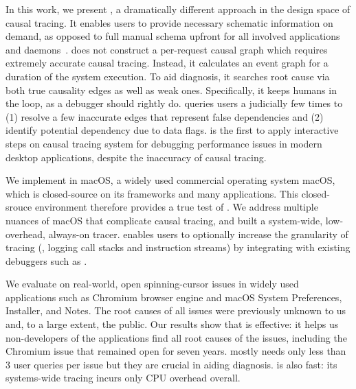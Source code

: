 In this work, we present \xxx, a dramatically different approach in the design
space of causal tracing. It enables users to provide necessary schematic
information on demand, as opposed to full manual schema upfront for all
involved applications and daemons~\cite{barham2004using, reynolds2006pip,
fonseca2007x}.  \xxx does not construct a per-request causal graph which
requires extremely accurate causal tracing. Instead, it calculates an event
graph for a duration of the system execution. To aid diagnosis, it searches
root cause via both true causality edges as well as weak ones.  Specifically,
it keeps humans in the loop, as a debugger should rightly do.  \xxx queries
users a judicially few times to (1) resolve a few inaccurate edges that
represent false dependencies and (2) identify potential dependency due to data
flags.  \xxx is the first to apply interactive steps on causal tracing system
for debugging performance issues in modern desktop applications, despite the
inaccuracy of causal tracing.

We implement \xxx in macOS, a widely used commercial operating system macOS,
which is closed-source on its frameworks and many applications.  This
closed-srouce environment therefore provides a true test of \xxx. We address
multiple nuances of macOS that complicate causal tracing, and built a
system-wide, low-overhead, always-on tracer. \xxx enables users to optionally
increase the granularity of tracing (\eg, logging call stacks and instruction
streams) by integrating with existing debuggers such as .

We evaluate \xxx on \nbug real-world, open spinning-cursor issues in widely
used applications such as Chromium browser engine and macOS System Preferences,
Installer, and Notes. The root causes of all \nbug issues were previously
unknown to us and, to a large extent, the public. Our results show that \xxx is
effective: it helps us non-developers of the applications find all root causes
of the issues, including the Chromium issue that remained open for seven years.
\xxx mostly needs only less than 3 user queries per issue but they are crucial
in aiding diagnosis. \xxx is also fast: its systems-wide tracing incurs only
\cpuoverhead CPU overhead overall.


